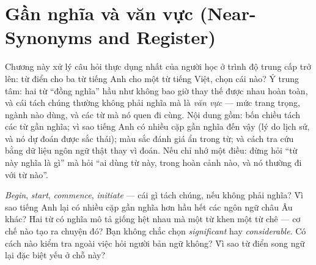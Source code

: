 \documentclass[../../english.tex]{subfiles}
\begin{document}
\chapter{Gần nghĩa và văn vực (Near-Synonyms and Register)}

\begin{tomtat}
Chương này xử lý câu hỏi thực dụng nhất của người học ở trình độ trung cấp trở lên: từ điển cho ba từ tiếng Anh cho một từ tiếng Việt, chọn cái nào? Ý trung tâm: hai từ ``đồng nghĩa'' hầu như không bao giờ thay thế được nhau hoàn toàn, và cái tách chúng thường không phải nghĩa mà là \emph{văn vực}\cite{biber1999} --- mức trang trọng, ngành nào dùng, và các từ mà nó quen đi cùng. Nội dung gồm: bốn chiều tách các từ gần nghĩa; vì sao tiếng Anh có nhiều cặp gần nghĩa đến vậy (lý do lịch sử, và nó dự đoán được sắc thái); màu sắc đánh giá ẩn trong từ; và cách tra cứu bằng dữ liệu ngôn ngữ thật thay vì đoán. Nếu chỉ nhớ một điều: đừng hỏi ``từ này nghĩa là gì'' mà hỏi ``ai dùng từ này, trong hoàn cảnh nào, và nó thường đi với từ nào''.
\end{tomtat}

\begin{nentang}
\end{nentang}

\begin{khoigoi}
\h{\emph{Begin}, \emph{start}, \emph{commence}, \emph{initiate} --- cái gì tách chúng, nếu không phải nghĩa?}
\h{Vì sao tiếng Anh lại có nhiều cặp gần nghĩa hơn hầu hết các ngôn ngữ châu Âu khác?}
\h{Hai từ có nghĩa mô tả giống hệt nhau mà một từ khen một từ chê --- cơ chế nào tạo ra chuyện đó?}
\h{Bạn không chắc chọn \emph{significant} hay \emph{considerable}. Có cách nào kiểm tra ngoài việc hỏi người bản ngữ không?}
\h{Vì sao từ điển song ngữ lại đặc biệt yếu ở chỗ này?}
\end{khoigoi}
\end{document}
